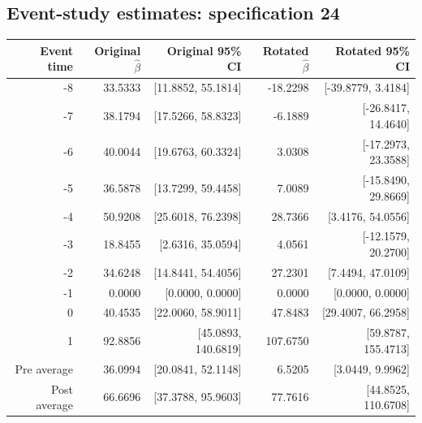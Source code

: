 \documentclass[10pt]{article}
\begin{document}
\subsection*{Event-study estimates: specification 24}
\begin{center}\scriptsize
\begin{tabular}{r rr rr}
\toprule
Event time & Original $\hat\beta$ & Original 95\% CI & Rotated $\hat\beta$ & Rotated 95\% CI \\
\midrule
-8 & 33.5333 & [11.8852, 55.1814] & -18.2298 & [-39.8779, 3.4184] \\
-7 & 38.1794 & [17.5266, 58.8323] & -6.1889 & [-26.8417, 14.4640] \\
-6 & 40.0044 & [19.6763, 60.3324] & 3.0308 & [-17.2973, 23.3588] \\
-5 & 36.5878 & [13.7299, 59.4458] & 7.0089 & [-15.8490, 29.8669] \\
-4 & 50.9208 & [25.6018, 76.2398] & 28.7366 & [3.4176, 54.0556] \\
-3 & 18.8455 & [2.6316, 35.0594] & 4.0561 & [-12.1579, 20.2700] \\
-2 & 34.6248 & [14.8441, 54.4056] & 27.2301 & [7.4494, 47.0109] \\
-1 & 0.0000 & [0.0000, 0.0000] & 0.0000 & [0.0000, 0.0000] \\
0 & 40.4535 & [22.0060, 58.9011] & 47.8483 & [29.4007, 66.2958] \\
1 & 92.8856 & [45.0893, 140.6819] & 107.6750 & [59.8787, 155.4713] \\
\midrule
Pre average & 36.0994 & [20.0841, 52.1148] & 6.5205 & [3.0449, 9.9962] \\
Post average & 66.6696 & [37.3788, 95.9603] & 77.7616 & [44.8525, 110.6708] \\
\bottomrule
\end{tabular}
\end{center}
\clearpage
\end{document}
